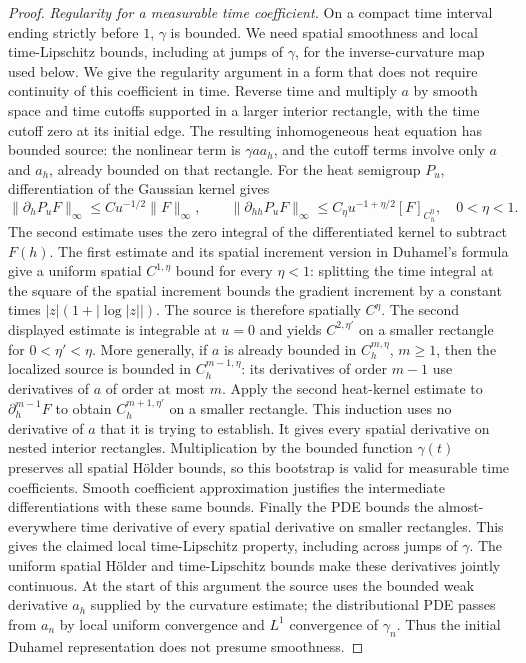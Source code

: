 \documentclass[11pt,a4paper]{article}
\numberwithin{equation}{section}
\theoremstyle{definition}
\theoremstyle{remark}
\begin{document}
\begin{proof}
\emph{Regularity for a measurable time coefficient.}
On a compact time interval ending strictly before $1$, $\gamma$ is
bounded. We need spatial smoothness and local time-Lipschitz bounds,
including at jumps of $\gamma$, for the inverse-curvature map used below.
We give the regularity argument in a form that does
not require continuity of this coefficient in time.  Reverse time and
multiply $a$ by smooth space and time cutoffs supported in a larger
interior rectangle, with the time cutoff zero at its initial edge.
The resulting inhomogeneous heat equation has bounded source: the
nonlinear term is $\gamma aa_h$, and the cutoff terms involve only
$a$ and $a_h$, already bounded on that rectangle.  For the heat
semigroup $P_u$, differentiation of the Gaussian kernel gives
\[
 \|\partial_hP_uF\|_\infty\le C u^{-1/2}\|F\|_\infty,
 \qquad
 \|\partial_{hh}P_uF\|_\infty
      \le C_\eta u^{-1+\eta/2}[F]_{C^\eta_h},
       \quad0<\eta<1.
\]
The second estimate uses the zero integral of the differentiated
kernel to subtract $F(h)$.  The first estimate and its spatial
increment version in Duhamel's formula give a uniform spatial
$C^{1,\eta}$ bound for every $\eta<1$: splitting the time integral
at the square of the spatial increment bounds the gradient increment
by a constant times $|z|(1+|\log|z||)$.  The source is therefore
spatially $C^\eta$.  The second displayed estimate is integrable at
$u=0$ and yields $C^{2,\eta'}$ on a smaller rectangle for
$0<\eta'<\eta$.  More generally, if $a$ is already bounded in
$C_h^{m,\eta}$, $m\ge1$, then the localized source is bounded in
$C_h^{m-1,\eta}$: its derivatives of order $m-1$ use derivatives
of $a$ of order at most $m$.  Apply the second heat-kernel estimate
to $\partial_h^{m-1}F$ to obtain $C_h^{m+1,\eta'}$ on a smaller
rectangle.  This induction uses no derivative of $a$ that it is
trying to establish.  It gives every spatial derivative on nested
interior rectangles.  Multiplication by the bounded function $\gamma(t)$
preserves all spatial H\"older bounds, so this bootstrap is valid
for measurable time coefficients.  Smooth coefficient approximation
justifies the intermediate differentiations with these same bounds.
Finally the PDE bounds the almost-everywhere time derivative of every
spatial derivative on smaller rectangles.  This gives the claimed
local time-Lipschitz property, including across jumps of $\gamma$.
The uniform spatial H\"older and time-Lipschitz bounds make these
derivatives jointly continuous.  At the start of this argument the
source uses the bounded weak derivative $a_h$ supplied by the
curvature estimate; the distributional PDE passes from $a_n$ by
local uniform convergence and $L^1$ convergence of $\gamma_n$.
Thus the initial Duhamel representation does not presume smoothness.


\end{proof}
\end{document}
